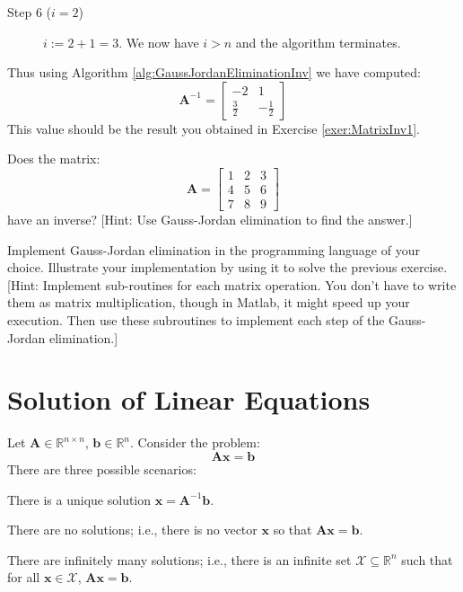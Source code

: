 \begin{example}
\begin{description}
\item[Step 6 ($i=2$)] $i := 2 + 1 = 3$. We now have $i > n$ and the algorithm terminates.
\end{description}

Thus using Algorithm \ref{alg:GaussJordanEliminationInv} we have computed:
\begin{displaymath}
\mathbf{A}^{-1} = \left[\begin{array}{cc}
-2 & 1\\
\frac{3}{2} & -\frac{1}{2}
\end{array}\right]
\end{displaymath}
This value should be the result you obtained in Exercise \ref{exer:MatrixInv1}.
\label{ex:GaussJordanEliminationInv}
\end{example}

\begin{exercise} Does the matrix:
\begin{displaymath}
\mathbf{A} = \begin{bmatrix}
1 & 2 & 3\\
4 & 5 & 6\\
7 & 8 & 9
\end{bmatrix}
\end{displaymath}
have an inverse? [Hint: Use Gauss-Jordan elimination to find the answer.]
\end{exercise}

\begin{exercise} Implement Gauss-Jordan elimination in the programming language of your choice. Illustrate your implementation by using it to solve the previous exercise. [Hint: Implement sub-routines for each matrix operation. You don't have to write them as matrix multiplication, though in Matlab, it might speed up your execution. Then use these subroutines to implement each step of the Gauss-Jordan elimination.]
\end{exercise}

\section{Solution of Linear Equations}
Let $\mathbf{A} \in \mathbb{R}^{n \times n}$, $\mathbf{b} \in \mathbb{R}^n$. Consider the problem:
\begin{equation}
\mathbf{A}\mathbf{x} = \mathbf{b}
\label{eqn:LinEqn}
\end{equation}
There are three possible scenarios:
\begin{enumerate*}
\item There is a unique solution $\mathbf{x} = \mathbf{A}^{-1}\mathbf{b}$.
\item There are no solutions; i.e., there is no vector $\mathbf{x}$ so that $\mathbf{A}\mathbf{x} = \mathbf{b}$.
\item There are infinitely many solutions; i.e., there is an infinite set $\mathcal{X} \subseteq \mathbb{R}^n$ such that for all $\mathbf{x} \in \mathcal{X}$, $\mathbf{A}\mathbf{x} = \mathbf{b}$.
\end{enumerate*}

